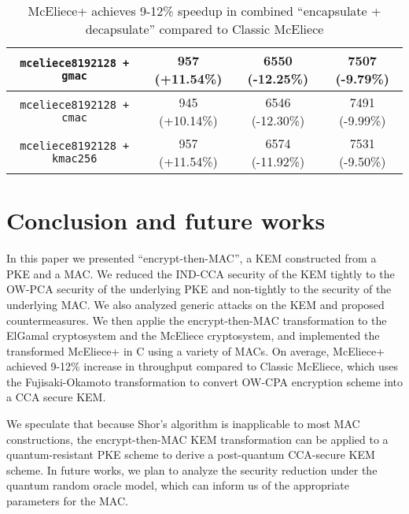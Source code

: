 \documentclass[runningheads]{llncs}
\begin{document}
\begin{table}[h]
\begin{tabular}[c]{|c|c|c|c|}
        \hline
        \texttt{mceliece8192128 + gmac} & 957 (+11.54\%) & 6550 (-12.25\%) & 7507 (-9.79\%) \\
        \hline
        \texttt{mceliece8192128 + cmac} & 945 (+10.14\%) & 6546 (-12.30\%) & 7491 (-9.99\%) \\
        \hline
        \texttt{mceliece8192128 + kmac256} & 957 (+11.54\%) & 6574 (-11.92\%) & 7531 (-9.50\%) \\
        \hline
    \end{tabular}\vspace{1em}
    \caption{McEliece+ achieves 9-12\% speedup in combined ``encapsulate + decapsulate'' compared to Classic McEliece}\label{tbl:mceliece-plus-performance}
\end{table}

\section{Conclusion and future works}\label{sec:conclusion}
In this paper we presented ``encrypt-then-MAC'', a KEM constructed from a PKE and a MAC. We reduced the IND-CCA security of the KEM tightly to the OW-PCA security of the underlying PKE and non-tightly to the security of the underlying MAC. We also analyzed generic attacks on the KEM and proposed countermeasures. We then applie the encrypt-then-MAC transformation to the ElGamal cryptosystem and the McEliece cryptosystem, and implemented the transformed McEliece+ in C using a variety of MACs. On average, McEliece+ achieved 9-12\% increase in throughput compared to Classic McEliece, which uses the Fujisaki-Okamoto transformation to convert OW-CPA encryption scheme into a CCA secure KEM.

We speculate that because Shor's algorithm \cite{DBLP:conf/focs/Shor94,DBLP:journals/siamcomp/Shor97} is inapplicable to most MAC constructions, the encrypt-then-MAC KEM transformation can be applied to a quantum-resistant PKE scheme to derive a post-quantum CCA-secure KEM scheme. In future works, we plan to analyze the security reduction under the quantum random oracle model, which can inform us of the appropriate parameters for the MAC.



\end{document}
